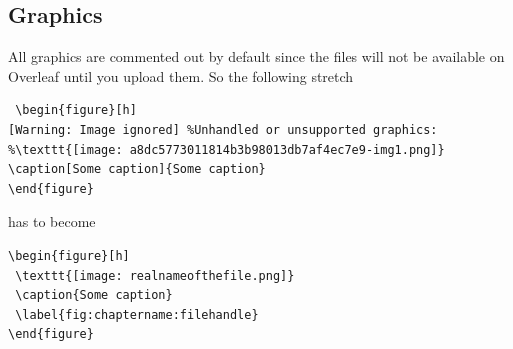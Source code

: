 % 
% 
% 
% 
% 
% 

\subsection{Graphics}
All graphics are commented out by default since the files will not be available on Overleaf until you upload them. So the following stretch

\begin{verbatim}
 \begin{figure}[h]
[Warning: Image ignored] %Unhandled or unsupported graphics:
%\texttt{[image: a8dc5773011814b3b98013db7af4ec7e9-img1.png]}
\caption[Some caption]{Some caption}
\end{figure}
\end{verbatim}

has to become


\begin{verbatim}
\begin{figure}[h]
 \texttt{[image: realnameofthefile.png]}
 \caption{Some caption}
 \label{fig:chaptername:filehandle}
\end{figure}
\end{verbatim}


